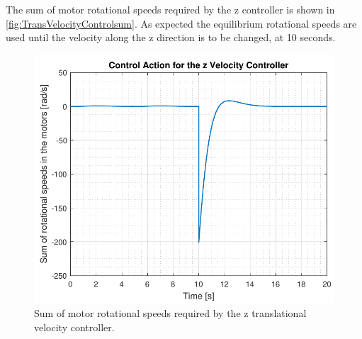 The sum of motor rotational speeds required by the z controller is shown in \autoref{fig:TransVelocityControlsum}. As expected the equilibrium rotational speeds are used until the velocity along the z direction is to be changed, at 10 seconds.
\begin{figure}[H]
	\centering
	\includegraphics[scale=0.65]{figures/simVelocityControllerSum}
	\caption{Sum of motor rotational speeds required by the z translational velocity controller.}
	\label{fig:TransVelocityControlsum}
\end{figure}

